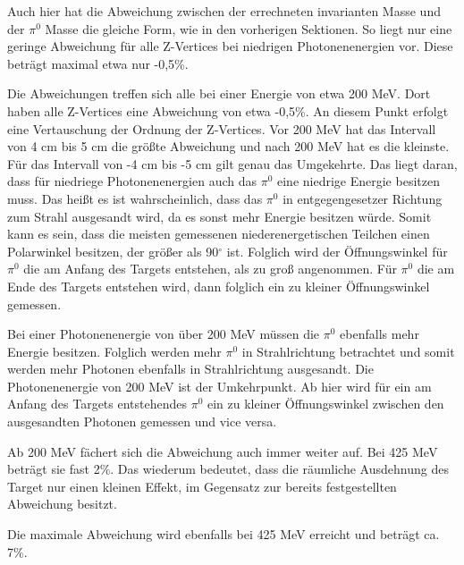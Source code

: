 \documentclass[a4paper,11pt,oneside,final,german,openbib,pdftex]{scrbook}
\begin{document}
{Auch hier hat die Abweichung zwischen der errechneten invarianten Masse und der $\pi^0$ Masse die gleiche Form, wie in den vorherigen Sektionen. So liegt nur eine geringe Abweichung f\"ur alle Z-Vertices bei niedrigen Photonenenergien vor. Diese betr\"agt maximal etwa nur -0,5\%. 

Die Abweichungen treffen sich alle bei einer Energie von etwa 200 MeV. Dort haben alle Z-Vertices eine Abweichung von etwa -0,5\%. An diesem Punkt erfolgt eine Vertauschung der Ordnung der Z-Vertices. Vor 200 MeV hat das Intervall von 4 cm bis 5 cm die gr\"o{\ss}te Abweichung und nach 200 MeV hat es die kleinste. F\"ur das Intervall von -4 cm bis -5 cm gilt genau das Umgekehrte. Das liegt daran, dass f\"ur niedriege Photonenenergien auch das $\pi^0$ eine niedrige Energie besitzen muss. Das hei{\ss}t es ist wahrscheinlich, dass das $\pi^0$ in entgegengesetzer Richtung zum Strahl ausgesandt wird, da es sonst mehr Energie besitzen w\"urde. Somit kann es sein, dass die meisten gemessenen niederenergetischen Teilchen einen Polarwinkel besitzen, der gr\"o{\ss}er als 90$^{\circ}$ ist. Folglich wird der \"Offnungswinkel f\"ur $\pi^0$ die am Anfang des Targets entstehen, als zu gro{\ss} angenommen. F\"ur $\pi^0$ die am Ende des Targets entstehen wird, dann folglich ein zu kleiner \"Offnungswinkel gemessen. 

Bei einer Photonenenergie von \"uber 200 MeV m\"ussen die $\pi^0$ ebenfalls mehr Energie besitzen. Folglich werden mehr $\pi^0$ in Strahlrichtung betrachtet und somit werden mehr Photonen ebenfalls in Strahlrichtung ausgesandt. Die Photonenenergie von 200 MeV ist der Umkehrpunkt.
Ab hier wird f\"ur ein am Anfang des Targets entstehendes $\pi^0$ ein zu kleiner \"Offnungswinkel zwischen den ausgesandten Photonen gemessen und vice versa.

Ab 200 MeV f\"achert sich die Abweichung auch immer weiter auf. Bei 425 MeV betr\"agt sie fast 2\%. Das wiederum bedeutet, dass die r\"aumliche Ausdehnung des Target nur einen kleinen Effekt, im Gegensatz zur bereits festgestellten Abweichung besitzt.

Die maximale Abweichung wird ebenfalls bei 425 MeV erreicht und betr\"agt ca. 7\%.

}
\end{document}
